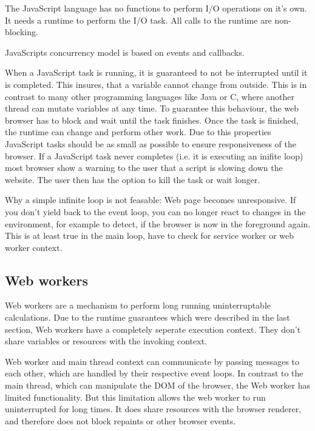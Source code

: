 \documentclass[article,type=bsc,colorback,accentcolor=tud9c]{tudthesis}
\begin{document}
  The JavaScript language has no functions to perform I/O operations on it's own. It needs a runtime to perform the I/O task. All calls to the runtime are non-blocking.

  JavaScripts concurrency model is based on events and callbacks.

  When a JavaScript task is running, it is guaranteed to not be interrupted until it is completed. This insures, that a variable cannot change from outside. This is in contrast to many other programming languages like Java or C, where another thread can mutate variables at any time. To guarantee this behaviour, the web browser has to block and wait until the task finishes. Once the task is finished, the runtime can change and perform other work. Due to this properties JavaScript tasks should be as small as possible to ensure responsiveness of the browser. If a JavaScript task never completes (i.e. it is executing an inifite loop) most browser show a warning to the user that a script is slowing down the website. The user then has the option to kill the task or wait longer.

  

  
  
  Why a simple infinite loop is not feasable: Web page becomes unresponsive. If you don't yield back to the event loop, you can no longer react to changes in the environment, for example to detect, if the browser is now in the foreground again. This is at least true in the main loop, have to check for service worker or web worker context.
  
  \subsection{Web workers}

  Web workers are a mechanism to perform long running uninterruptable calculations. Due to the runtime guarantees which were described in the last section, Web workers have a completely seperate execution context. They don't share variables or resources with the invoking context.

  Web worker and main thread context can communicate by passing messages to each other, which are handled by their respective event loops. In contrast to the main thread, which can manipulate the DOM of the browser, the Web worker has limited functionality. But this limitation allows the web worker to run uninterrupted for long times. It does share resources with the browser renderer, and therefore does not block repaints or other browser events.
\end{document}
